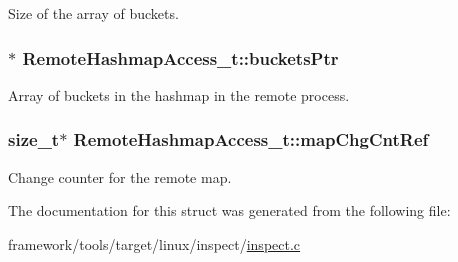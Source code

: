 Size of the array of buckets. 

\subsubsection[{\texorpdfstring{buckets\+Ptr}{bucketsPtr}}]{$\ast$ Remote\+Hashmap\+Access\+\_\+t\+::buckets\+Ptr}\hypertarget{struct_remote_hashmap_access__t_a404cf287eb894f289af0f9d8102a966a}{}\label{struct_remote_hashmap_access__t_a404cf287eb894f289af0f9d8102a966a}


Array of buckets in the hashmap in the remote process. 

\subsubsection[{\texorpdfstring{map\+Chg\+Cnt\+Ref}{mapChgCntRef}}]{\setlength{\rightskip}{0pt plus 5cm}size\+\_\+t$\ast$ Remote\+Hashmap\+Access\+\_\+t\+::map\+Chg\+Cnt\+Ref}\hypertarget{struct_remote_hashmap_access__t_a937cc41d9a0077e051755c1f44d2f8d8}{}\label{struct_remote_hashmap_access__t_a937cc41d9a0077e051755c1f44d2f8d8}


Change counter for the remote map. 



The documentation for this struct was generated from the following file\+:\begin{DoxyCompactItemize}
\item 
framework/tools/target/linux/inspect/\hyperlink{inspect_8c}{inspect.\+c}\end{DoxyCompactItemize}
